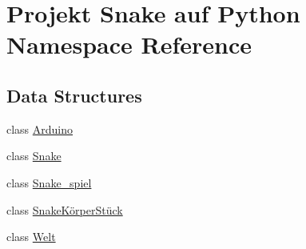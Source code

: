 \hypertarget{namespace_projekt_01_snake_01auf_01_python}{}\section{Projekt Snake auf Python Namespace Reference}
\label{namespace_projekt_01_snake_01auf_01_python}
\subsection*{Data Structures}
\begin{DoxyCompactItemize}
\item 
class \mbox{\hyperlink{class_projekt_01_snake_01auf_01_python_1_1_arduino}{Arduino}}
\item 
class \mbox{\hyperlink{class_projekt_01_snake_01auf_01_python_1_1_snake}{Snake}}
\item 
class \mbox{\hyperlink{class_projekt_01_snake_01auf_01_python_1_1_snake__spiel}{Snake\+\_\+spiel}}
\item 
class \mbox{\hyperlink{class_projekt_01_snake_01auf_01_python_1_1_snake_k_xC3_xB6rper_st_xC3_xBCck}{Snake\+Körper\+Stück}}
\item 
class \mbox{\hyperlink{class_projekt_01_snake_01auf_01_python_1_1_welt}{Welt}}
\end{DoxyCompactItemize}
